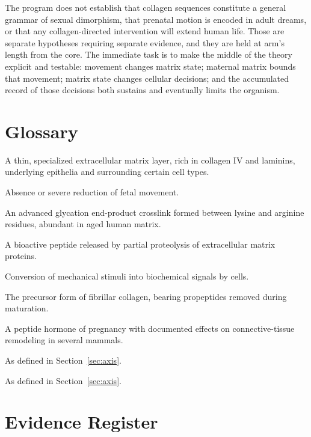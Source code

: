 \documentclass[11pt,a4paper]{article}
\theoremstyle{plain}
\theoremstyle{definition}
\theoremstyle{remark}
\begin{document}
The program does not establish that collagen sequences constitute a general grammar of sexual dimorphism, that prenatal motion is encoded in adult dreams, or that any collagen-directed intervention will extend human life. Those are separate hypotheses requiring separate evidence, and they are held at arm's length from the core. The immediate task is to make the middle of the theory explicit and testable: movement changes matrix state; maternal matrix bounds that movement; matrix state changes cellular decisions; and the accumulated record of those decisions both sustains and eventually limits the organism.

\appendix

\section{Glossary}

\begin{description}[leftmargin=1.5em,itemsep=2pt]
\item[Basement membrane.] A thin, specialized extracellular matrix layer, rich in collagen IV and laminins, underlying epithelia and surrounding certain cell types.
\item[Fetal akinesia.] Absence or severe reduction of fetal movement.
\item[Glucosepane.] An advanced glycation end-product crosslink formed between lysine and arginine residues, abundant in aged human matrix.
\item[Matrikine.] A bioactive peptide released by partial proteolysis of extracellular matrix proteins.
\item[Mechanotransduction.] Conversion of mechanical stimuli into biochemical signals by cells.
\item[Procollagen.] The precursor form of fibrillar collagen, bearing propeptides removed during maturation.
\item[Relaxin.] A peptide hormone of pregnancy with documented effects on connective-tissue remodeling in several mammals.
\item[Remodeling capacity ($P$).] As defined in Section~\ref{sec:axis}.
\item[Recorded history ($H$).] As defined in Section~\ref{sec:axis}.
\end{description}

\section{Evidence Register}
\end{document}
